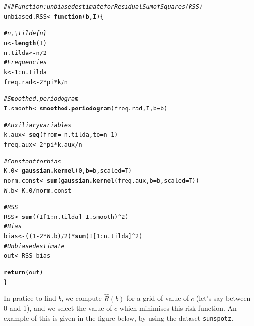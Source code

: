 \documentclass{article}\usepackage[]{graphicx}\usepackage[]{color}
\makeatletter
\newcommand{\hlnum}[1]{\textcolor[rgb]{0.686,0.059,0.569}{#1}}%
\newcommand{\hlcom}[1]{\textcolor[rgb]{0.678,0.584,0.686}{\textit{#1}}}%
\newcommand{\hlopt}[1]{\textcolor[rgb]{0,0,0}{#1}}%
\newcommand{\hlstd}[1]{\textcolor[rgb]{0.345,0.345,0.345}{#1}}%
\newcommand{\hlkwa}[1]{\textcolor[rgb]{0.161,0.373,0.58}{\textbf{#1}}}%
\newcommand{\hlkwb}[1]{\textcolor[rgb]{0.69,0.353,0.396}{#1}}%
\newcommand{\hlkwc}[1]{\textcolor[rgb]{0.333,0.667,0.333}{#1}}%
\newcommand{\hlkwd}[1]{\textcolor[rgb]{0.737,0.353,0.396}{\textbf{#1}}}%
\newenvironment{kframe}{%
 \def\at@end@of@kframe{}%
 \ifinner\ifhmode%
  \def\at@end@of@kframe{\end{minipage}}%
  \begin{minipage}{\columnwidth}%
 \fi\fi%
 \def\FrameCommand##1{\hskip\@totalleftmargin \hskip-\fboxsep
 \colorbox{shadecolor}{##1}\hskip-\fboxsep
     \hskip-\linewidth \hskip-\@totalleftmargin \hskip\columnwidth}%
 \MakeFramed {\advance\hsize-\width
   \@totalleftmargin\z@ \linewidth\hsize
   \@setminipage}}%
 {\par\unskip\endMakeFramed%
 \at@end@of@kframe}
\newenvironment{knitrout}{}{} %
\makeatother
\begin{document}
\begin{knitrout}\footnotesize
{}\color{fgcolor}\begin{kframe}
\begin{alltt}
\hlcom{### Function: unbiased estimate for Residual Sum of Squares (RSS)}
\hlstd{unbiased.RSS} \hlkwb{<-} \hlkwa{function}\hlstd{(}\hlkwc{b}\hlstd{,} \hlkwc{I}\hlstd{) \{}

  \hlcom{# n, \textbackslash{}tilde\{n\}}
  \hlstd{n} \hlkwb{<-} \hlkwd{length}\hlstd{(I)}
  \hlstd{n.tilda} \hlkwb{<-} \hlstd{n}\hlopt{/}\hlnum{2}
  \hlcom{# Frequencies}
  \hlstd{k} \hlkwb{<-} \hlnum{1}\hlopt{:}\hlstd{n.tilda}
  \hlstd{freq.rad} \hlkwb{<-} \hlnum{2}\hlopt{*}\hlstd{pi}\hlopt{*}\hlstd{k}\hlopt{/}\hlstd{n}

  \hlcom{# Smoothed.periodogram}
  \hlstd{I.smooth} \hlkwb{<-} \hlkwd{smoothed.periodogram}\hlstd{(freq.rad, I,} \hlkwc{b} \hlstd{= b)}

  \hlcom{# Auxiliary variables}
  \hlstd{k.aux} \hlkwb{<-} \hlkwd{seq}\hlstd{(}\hlkwc{from} \hlstd{=} \hlopt{-}\hlstd{n.tilda,} \hlkwc{to} \hlstd{= n} \hlopt{-} \hlnum{1}\hlstd{)}
  \hlstd{freq.aux} \hlkwb{<-} \hlnum{2}\hlopt{*}\hlstd{pi}\hlopt{*}\hlstd{k.aux}\hlopt{/}\hlstd{n}

  \hlcom{# Constant for bias}
  \hlstd{K.0} \hlkwb{<-} \hlkwd{gaussian.kernel}\hlstd{(}\hlnum{0}\hlstd{,} \hlkwc{b} \hlstd{= b,} \hlkwc{scaled} \hlstd{= T)}
  \hlstd{norm.const} \hlkwb{<-} \hlkwd{sum}\hlstd{(}\hlkwd{gaussian.kernel}\hlstd{(freq.aux,} \hlkwc{b} \hlstd{= b,} \hlkwc{scaled} \hlstd{= T))}
  \hlstd{W.b} \hlkwb{<-} \hlstd{K.0}\hlopt{/}\hlstd{norm.const}

  \hlcom{# RSS}
  \hlstd{RSS} \hlkwb{<-} \hlkwd{sum}\hlstd{((I[}\hlnum{1}\hlopt{:}\hlstd{n.tilda]} \hlopt{-} \hlstd{I.smooth)}\hlopt{^}\hlnum{2}\hlstd{)}
  \hlcom{# Bias}
  \hlstd{bias} \hlkwb{<-} \hlstd{((}\hlnum{1} \hlopt{-} \hlnum{2}\hlopt{*}\hlstd{W.b)}\hlopt{/}\hlnum{2}\hlstd{)} \hlopt{*} \hlkwd{sum}\hlstd{(I[}\hlnum{1}\hlopt{:}\hlstd{n.tilda]}\hlopt{^}\hlnum{2}\hlstd{)}
  \hlcom{# Unbiased estimate}
  \hlstd{out} \hlkwb{<-} \hlstd{RSS} \hlopt{-} \hlstd{bias}

  \hlkwd{return}\hlstd{(out)}
\hlstd{\}}
\end{alltt}
\end{kframe}
\end{knitrout}

In pratice to find $b$, we compute $\hat{R}(b)$ for a grid of value of $c$ (let's say between 0 and 1), and we select the value of $c$ which minimises this risk function. An example of this is given in the figure below, by using the dataset \texttt{sunspotz}.
\end{document}
